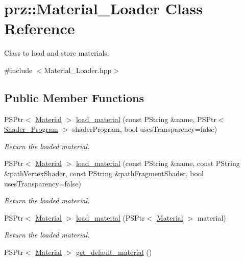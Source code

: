 \hypertarget{classprz_1_1_material___loader}{}\section{prz\+::Material\+\_\+\+Loader Class Reference}
\label{classprz_1_1_material___loader}


Class to load and store materials.  




{\ttfamily \#include $<$Material\+\_\+\+Loader.\+hpp$>$}

\subsection*{Public Member Functions}
\begin{DoxyCompactItemize}
\item 
P\+S\+Ptr$<$ \mbox{\hyperlink{classprz_1_1_material}{Material}} $>$ \mbox{\hyperlink{classprz_1_1_material___loader_a384534b5e8e8a558a0ad4df508ec5c33}{load\+\_\+material}} (const P\+String \&name, P\+S\+Ptr$<$ \mbox{\hyperlink{classprz_1_1_shader___program}{Shader\+\_\+\+Program}} $>$ shader\+Program, bool uses\+Transparency=false)
\begin{DoxyCompactList}\small\item\em Return the loaded material. \end{DoxyCompactList}\item 
P\+S\+Ptr$<$ \mbox{\hyperlink{classprz_1_1_material}{Material}} $>$ \mbox{\hyperlink{classprz_1_1_material___loader_a7053997fa500ea92a4759126ceac7449}{load\+\_\+material}} (const P\+String \&name, const P\+String \&path\+Vertex\+Shader, const P\+String \&path\+Fragment\+Shader, bool uses\+Transparency=false)
\begin{DoxyCompactList}\small\item\em Return the loaded material. \end{DoxyCompactList}\item 
P\+S\+Ptr$<$ \mbox{\hyperlink{classprz_1_1_material}{Material}} $>$ \mbox{\hyperlink{classprz_1_1_material___loader_a0d05a8baf5e0c0ba42ba543eef665ab1}{load\+\_\+material}} (P\+S\+Ptr$<$ \mbox{\hyperlink{classprz_1_1_material}{Material}} $>$ material)
\begin{DoxyCompactList}\small\item\em Return the loaded material. \end{DoxyCompactList}\item 
P\+S\+Ptr$<$ \mbox{\hyperlink{classprz_1_1_material}{Material}} $>$ \mbox{\hyperlink{classprz_1_1_material___loader_a819c44607837169bbaa41d625902bef6}{get\+\_\+default\+\_\+material}} ()

\end{DoxyCompactItemize}
